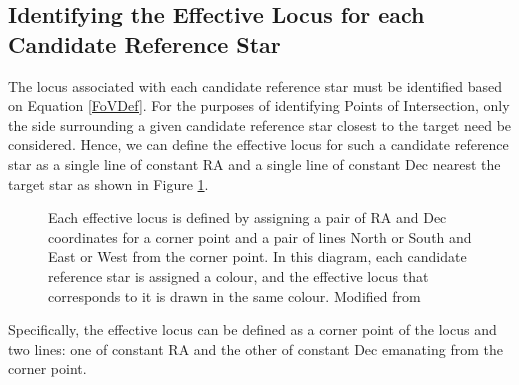 \documentclass{aa}
\begin{document}
\subsection{Identifying the Effective Locus for each Candidate Reference Star}
\label{identifying-the-effective-locus-for-each-candidate-reference-star}

The locus associated with each candidate reference star must be
identified based on Equation \ref{FoVDef}. For the purposes of identifying Points
of Intersection, only the side surrounding a given candidate reference
star closest to the target need be considered. Hence, we can define the
effective locus for such a candidate reference star as a single line of
constant RA and a single line of constant Dec nearest the target star
as shown in Figure \ref{effective_locus}.

\begin{figure}
\caption{\label{effective_locus}Each effective locus is defined by assigning a pair
of RA and Dec coordinates for a corner point and a pair of lines North
or South and East or West from the corner point. In this diagram, each
candidate reference star is assigned a colour, and the effective locus
that corresponds to it is drawn in the same colour. Modified from \citet{creaner2016thesis}}
\end{figure}

Specifically, the effective locus can be defined as a corner point of
the locus and two lines: one of constant RA and the other of constant
Dec emanating from the corner point. 
\end{document}
